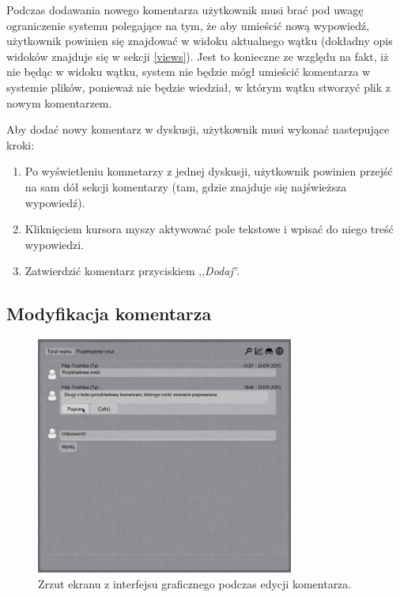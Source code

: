 Podczas dodawania nowego komentarza użytkownik musi brać pod uwagę ograniczenie systemu polegające na tym, że aby umieścić nową wypowiedź, użytkownik powinien się znajdować w widoku aktualnego wątku (dokładny opis widoków znajduje się w sekcji \ref{views}). Jest to konieczne ze względu na fakt, iż nie będąc w widoku wątku, system nie będzie mógł umieścić komentarza w systemie plików, ponieważ nie będzie wiedział, w którym wątku stworzyć plik z nowym komentarzem.

Aby dodać nowy komentarz w dyskusji, użytkownik musi wykonać nastepujące kroki:

\begin{enumerate}[noitemsep]
  \item Po wyświetleniu komnetarzy z jednej dyskusji, użytkownik powinien przejść na sam dół sekcji komentarzy (tam, gdzie znajduje się najświeższa wypowiedź).
  
  \item Kliknięciem kursora myszy aktywować pole tekstowe i wpisać do niego treść wypowiedzi.
  
  \item Zatwierdzić komentarz przyciskiem ,,\emph{Dodaj}''.
\end{enumerate}

\subsection*{Modyfikacja komentarza}

\begin{figure}[h!]
  \vspace{5pt}
  \begin{center}
    \includegraphics[width=240pt]{figures/screenshoteditcomment1.png}
  \end{center}
  \caption{Zrzut ekranu z interfejsu graficznego podczas edycji komentarza.}
\end{figure}

